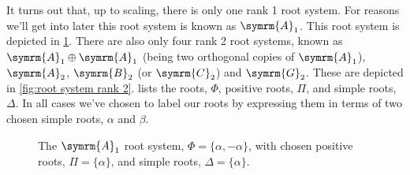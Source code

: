 \documentclass[fleqn]{NotesClass}
\newcommand{\dynkin}[2]{\symrm{#1}_{#2}}
\begin{document}
    It turns out that, up to scaling, there is only one rank 1 root system.
    For reasons we'll get into later this root system is known as \(\dynkin{A}{1}\).
    This root system is depicted in \cref{fig:root system A1}.
    There are also only four rank 2 root systems, known as \(\dynkin{A}{1} \oplus \dynkin{A}{1}\) (being two orthogonal copies of \(\dynkin{A}{1}\)), \(\dynkin{A}{2}\), \(\dynkin{B}{2}\) (or \(\dynkin{C}{2}\)) and \(\dynkin{G}{2}\).
    These are depicted in \cref{fig:root system rank 2}.
     lists the roots, \(\Phi\), positive roots, \(\Pi\), and simple roots, \(\Delta\).
    In all cases we've chosen to label our roots by expressing them in terms of two chosen simple roots, \(\alpha\) and \(\beta\).
    
    \begin{figure}
        \centering
        \caption{The \(\dynkin{A}{1}\) root system, \(\Phi = \{\alpha, -\alpha\}\), with chosen positive roots, \(\Pi = \{\alpha\}\), and simple roots, \(\Delta = \{\alpha\}\).}
        \label{fig:root system A1}
    \end{figure}
    
\end{document}
